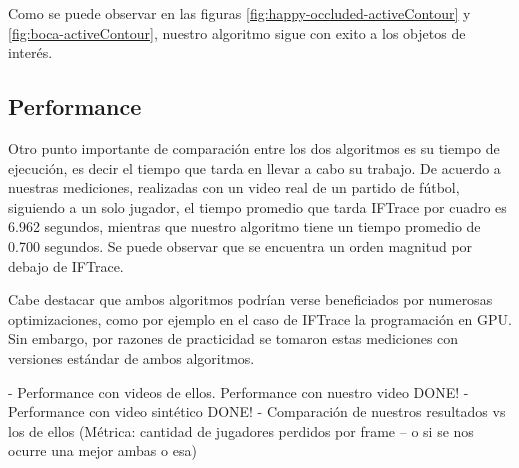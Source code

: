
Como se puede observar en las figuras \ref{fig:happy-occluded-activeContour} y \ref{fig:boca-activeContour}, nuestro algoritmo
sigue con exito a los objetos de interés.

\subsection{Performance}

Otro punto importante de comparación entre los dos algoritmos es su tiempo de ejecución, es decir el tiempo que tarda en llevar a cabo su trabajo.
De acuerdo a nuestras mediciones, realizadas con un video real de un partido de fútbol, siguiendo a un solo jugador, el tiempo promedio que
tarda IFTrace por cuadro es 6.962 segundos, mientras que nuestro algoritmo tiene un tiempo promedio de 0.700 segundos. Se puede observar que
se encuentra un orden magnitud por debajo de IFTrace.

Cabe destacar que ambos algoritmos podrían verse beneficiados por numerosas optimizaciones, como por ejemplo en el caso de IFTrace la programación
en GPU. Sin embargo, por razones de practicidad se tomaron estas mediciones con versiones estándar de ambos algoritmos.

- Performance con videos de ellos. Performance con nuestro video DONE!
- Performance con video sintético DONE!
- Comparación de nuestros resultados vs los de ellos (Métrica: cantidad de jugadores perdidos por frame -- o si se nos ocurre una mejor ambas o esa)
